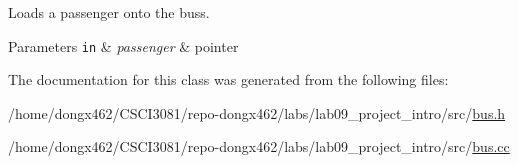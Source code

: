 Loads a passenger onto the buss. 


\begin{DoxyParams}[1]{Parameters}
\mbox{\tt in}  & {\em passenger} & pointer \\
\hline
\end{DoxyParams}


The documentation for this class was generated from the following files\+:\begin{DoxyCompactItemize}
\item 
/home/dongx462/\+C\+S\+C\+I3081/repo-\/dongx462/labs/lab09\+\_\+project\+\_\+intro/src/\hyperlink{bus_8h}{bus.\+h}\item 
/home/dongx462/\+C\+S\+C\+I3081/repo-\/dongx462/labs/lab09\+\_\+project\+\_\+intro/src/\hyperlink{bus_8cc}{bus.\+cc}\end{DoxyCompactItemize}
